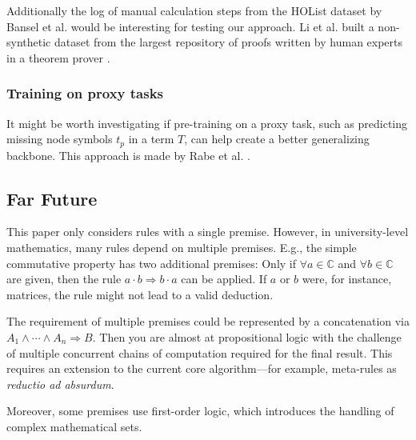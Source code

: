 \documentclass{scrartcl}
\theoremstyle{definition}
\begin{document}
Additionally the log of manual calculation steps from the HOList dataset by Bansel et al. \cite{kaliszyk2017holstep} would be interesting for testing our approach.
Li et al. built a non-synthetic dataset from the largest repository of proofs written by human experts in a theorem prover \cite{li2021isarstep}.

\subsubsection{Training on proxy tasks}

It might be worth investigating if pre-training on a proxy task, such as predicting missing node symbols $t_p$ in a term $T$, can help create a better generalizing backbone.
This approach is made by Rabe et al. \cite{rabe2020mathematical}.

\subsection{Far Future}

This paper only considers rules with a single premise.
However, in university-level mathematics, many rules depend on multiple premises.
E.g., the simple commutative property has two additional premises: Only if $\forall a \in \mathbb{C}$ and $\forall b \in \mathbb{C}$ are given,
then the rule $a\cdot b \Longrightarrow b\cdot a$ can be applied. If $a$ or $b$ were, for instance, matrices, the rule might not lead to a valid deduction.

The requirement of multiple premises could be represented by a concatenation via $A_1 \wedge \cdots \wedge A_n \Longrightarrow B$.
Then you are almost at propositional logic with the challenge of multiple concurrent chains of computation required for the final result.
This requires an extension to the current core algorithm—for example, meta-rules as \textit{reductio ad absurdum}.

Moreover, some premises use first-order logic, which introduces the handling of complex mathematical sets.


\printbibliography
\end{document}
